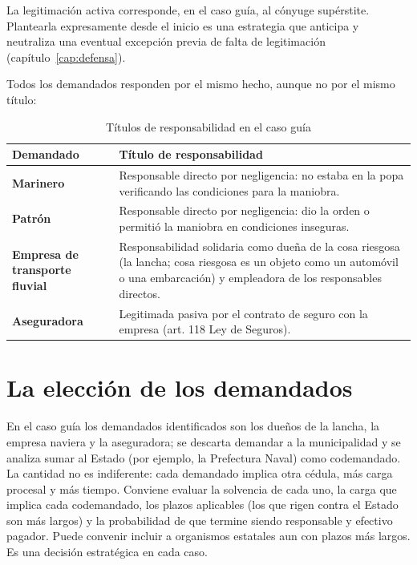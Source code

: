 \documentclass[12pt,oneside]{book}
\begin{document}
La legitimación activa corresponde, en el caso guía, al cónyuge supérstite. Plantearla expresamente desde el inicio es una estrategia que anticipa y neutraliza una eventual excepción previa de falta de legitimación (capítulo~\ref{cap:defensa}).

Todos los demandados responden por el mismo hecho, aunque no por el mismo título:

\begin{table}[H]
\centering
\caption{Títulos de responsabilidad en el caso guía}
\begin{tabularx}{\textwidth}{>{\raggedright\arraybackslash\bfseries}p{} X}
\toprule
Demandado & Título de responsabilidad \\
\midrule
Marinero & Responsable directo por negligencia: no estaba en la popa verificando las condiciones para la maniobra. \\
Patrón & Responsable directo por negligencia: dio la orden o permitió la maniobra en condiciones inseguras. \\
Empresa de transporte fluvial & Responsabilidad solidaria como dueña de la cosa riesgosa (la lancha; cosa riesgosa es un objeto como un automóvil o una embarcación) y empleadora de los responsables directos. \\
Aseguradora & Legitimada pasiva por el contrato de seguro con la empresa (art. 118 Ley de Seguros). \\
\bottomrule
\end{tabularx}
\end{table}


\section{La elección de los demandados}

En el caso guía los demandados identificados son los dueños de la lancha, la empresa naviera y la aseguradora; se descarta demandar a la municipalidad y se analiza sumar al Estado (por ejemplo, la Prefectura Naval) como codemandado. La cantidad no es indiferente: cada demandado implica otra cédula, más carga procesal y más tiempo. Conviene evaluar la solvencia de cada uno, la carga que implica cada codemandado, los plazos aplicables (los que rigen contra el Estado son más largos) y la probabilidad de que termine siendo responsable y efectivo pagador. Puede convenir incluir a organismos estatales aun con plazos más largos. Es una decisión estratégica en cada caso.
\end{document}
